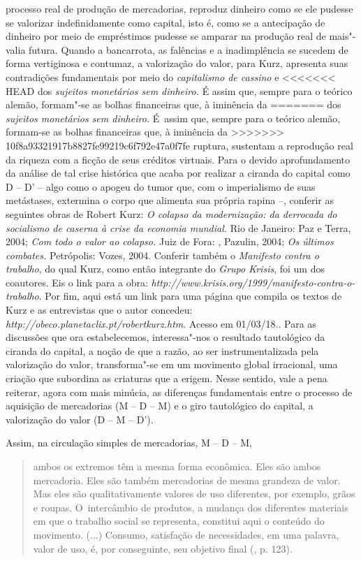 {{  processo real de produção de mercadorias, reproduz dinheiro como se
  ele pudesse se valorizar indefinidamente como capital, isto é, como se
  a antecipação de dinheiro por meio de empréstimos pudesse se amparar
  na produção real de mais"-valia futura. Quando a bancarrota, as
  falências e a inadimplência se sucedem de forma vertiginosa e
  contumaz, a valorização do valor, para Kurz, apresenta suas
  contradições fundamentais por meio do \emph{capitalismo de cassino} e
<<<<<<< HEAD
  dos \emph{sujeitos monetários sem dinheiro.} É assim que, sempre para
  o teórico alemão, formam"-se as bolhas financeiras que, à iminência da
=======
  dos \emph{sujeitos monetários sem dinheiro.} É~assim que, sempre para
  o teórico alemão, formam-se as bolhas financeiras que, à iminência da
>>>>>>> 10f8a93321917b8827fe99219c6f792e47a0f7fe
  ruptura, sustentam a reprodução real da riqueza com a ficção de seus
  créditos virtuais. Para o devido aprofundamento da análise de tal
  crise histórica que acaba por realizar a ciranda do capital como D --
  D' -- algo como o apogeu do tumor que, com o imperialismo de suas
  metástases, extermina o corpo que alimenta sua própria rapina --,
  conferir as seguintes obras de Robert Kurz: \emph{O colapso da
  modernização: da derrocada do socialismo de caserna à crise da
  economia mundial.} Rio de Janeiro: Paz e Terra, 2004; \emph{Com todo o
  valor ao colapso.} Juiz de Fora: , Pazulin, 2004; \emph{Os últimos
  combates.} Petrópolis: Vozes, 2004. Conferir também o \emph{Manifesto
  contra o trabalho}, do qual Kurz, como então integrante do \emph{Grupo
  Krisis}, foi um dos coautores. Eis o link para a obra:
  \emph{http://www.krisis.org/1999/manifesto-contra-o-trabalho}.
  Por fim, aqui está um link para uma página que compila os textos de
  Kurz e as entrevistas que o autor concedeu:
  \emph{http://obeco.planetaclix.pt/robertkurz.htm}.
  Acesso em 01/03/18.}. Para as discussões que ora estabelecemos,
interessa"-nos o resultado tautológico da ciranda do capital, a noção de
que a razão, ao ser instrumentalizada pela valorização do valor,
transforma"-se em um movimento global irracional, uma criação que
subordina as criaturas que a erigem. Nesse sentido, vale a pena
reiterar, agora com mais minúcia, as diferenças fundamentais entre o
processo de aquisição de mercadorias (M -- D -- M) e o giro tautológico
do capital, a valorização do valor (D -- M -- D').

Assim, na circulação simples de mercadorias, M -- D -- M,

\begin{quote}
ambos os extremos têm a mesma forma econômica. Eles são ambos
mercadoria. Eles são também mercadorias de mesma grandeza de valor. Mas
eles são qualitativamente valores de uso diferentes, por exemplo, grãos
e roupas. O~intercâmbio de produtos, a mudança dos diferentes materiais
em que o trabalho social se representa, constitui aqui o conteúdo do
movimento. (...) Consumo, satisfação de necessidades, em uma palavra,
valor de uso, é, por conseguinte, seu objetivo final (, p. 123).
\end{quote}

}
